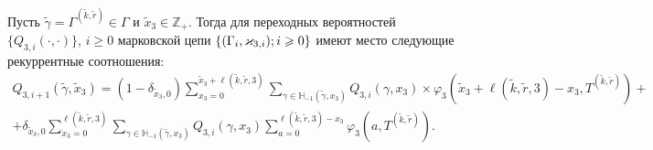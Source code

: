\documentclass[a4paper,12pt,russian]{extarticle}
\newcommand{\MarkThree}{\{(\Gamma_i, \varkappa_{3,i}); \hm{} i \geqslant 0\}}
\begin{document}
\begin{theorem}
Пусть $\tilde{\gamma} =\Gamma^{(\tilde{k},\tilde{r})}\in \Gamma$ и $\tilde{x}_3 \in {\mathbb Z}_+$. Тогда для переходных вероятностей $\{Q_{3,i}(\cdot,\cdot)\}$, ${i\geqslant 0}$ марковской цепи $\MarkThree$ имеют место следующие рекуррентные соотношения:
\begin{multline}
Q_{3,i+1}(\tilde{\gamma},\tilde{x}_3) = (1-\delta_{\tilde{x}_3,0}) \sum_{x_3=0}^{\tilde{x}_3 +  \ell(\tilde{k},\tilde{r},3)}\sum_{\gamma \in {\mathbb H}_{-1}(\tilde{\gamma},x_3)} Q_{3,i}(\gamma,x_3) \times 
\varphi_3(\tilde{x}_3 + \ell(\tilde{k},\tilde{r},3) - x_3,T^{(\tilde{k},\tilde{r})}) + \\
+ \delta_{\tilde{x}_3,0} \sum_{x_3=0}^{\ell(\tilde{k},\tilde{r},3)}\sum_{\gamma \in {\mathbb H}_{-1}(\tilde{\gamma},x_3)} Q_{3,i}(\gamma,x_3) \sum_{a=0}^{\ell(\tilde{k},\tilde{r},3) - x_3} \varphi_3(a,T^{(\tilde{k},\tilde{r})}).
\label{prob:rek}
\end{multline}
\end{theorem}
\end{document}

